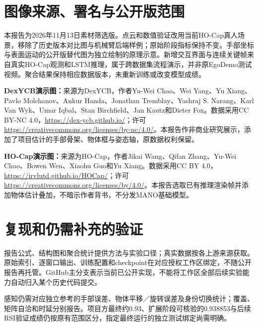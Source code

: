 \section{图像来源、署名与公开版范围}
本报告为2026年11月13日素材筛选版。点云和数值验证改用当前HO-Cap真人场景，移除了历史版本对比图与机械臂后端样例；原始阶段指标保持不变。手部坐标与表面运动的公开版替代图为独立绘制的原理示意。新增交互界面与连续关键帧来自真实HO-Cap观测和LSTM推理，属于跨数据集流程演示，并非原EgoDemo测试视频。聚合结果保持相应数据版本，未重新训练或改变模型成绩。

\textbf{DexYCB演示图：}来源为DexYCB，作者Yu-Wei Chao、Wei Yang、Yu Xiang、Pavlo Molchanov、Ankur Handa、Jonathan Tremblay、Yashraj S. Narang、Karl Van Wyk、Umar Iqbal、Stan Birchfield、Jan Kautz和Dieter Fox。数据采用CC BY-NC 4.0，\url{https://dex-ycb.github.io/}；许可\url{https://creativecommons.org/licenses/by-nc/4.0/}。本报告作非商业研究展示，添加了项目估计的手部骨架、物体框与姿态轴，原数据权利保留。

\textbf{HO-Cap演示图：}来源为HO-Cap，作者Jikai Wang、Qifan Zhang、Yu-Wei Chao、Bowen Wen、Xiaohu Guo和Yu Xiang。数据采用CC BY 4.0，\url{https://irvlutd.github.io/HOCap/}；许可\url{https://creativecommons.org/licenses/by/4.0/}。本报告选取已有推理渲染帧并添加物体估计叠加，不暗示作者背书，不分发MANO基础模型。

\section{复现和仍需补充的验证}
报告公式、结构图和聚合统计提供方法与实验口径；真实数据按各上游来源获取。原始索引、逐窗口输出、训练配置和checkpoint在对应授权工作区绑定，不随公开报告再托管。GitHub主分支表示当前已公开实现，不能将工作区全部后续实验能力自动归入某个历史代码提交。

感知仍需对应独立参考的手部误差、物体平移／旋转误差及身份切换统计；覆盖、矩阵自洽和时延分别报告。项目方最终约0.93、扩展阶段可核验的0.938853与后续RSI验证成绩仍按原有范围区分，指定最终运行的独立测试绑定尚需明确。

